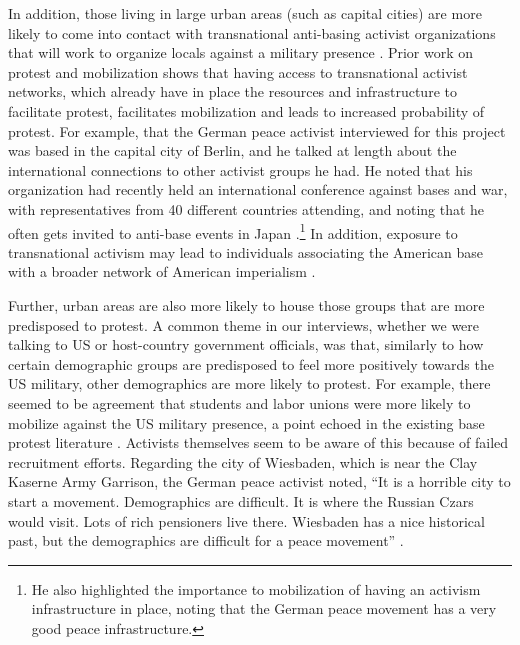 In addition, those living in large urban areas (such as capital cities) are more likely to come into contact with transnational anti-basing activist organizations that will work to organize locals against a military presence \cite{Murdie2011,Murdie2015,Kiyani2020}. Prior work on protest and mobilization shows that having access to transnational activist networks, which already have in place the resources and infrastructure to facilitate protest, facilitates mobilization and leads to increased probability of protest. For example, that the German peace activist interviewed for this project was based in the capital city of Berlin, and he talked at length about the international connections to other activist groups he had. He noted that his organization had recently held an international conference against bases and war, with representatives from 40 different countries attending, and noting that he often gets invited to anti-base events in Japan \cite{berlinone20190723}.\footnote{He also highlighted the importance to mobilization of having an activism infrastructure in place, noting that the German peace movement has a very good peace infrastructure.} In addition, exposure to transnational activism may lead to individuals associating the American base with a broader network of American imperialism \cite{Immerwahr2019}.  

Further, urban areas are also more likely to house those groups that are more predisposed to protest. A common theme in our interviews, whether we were talking to US or host-country government officials, was that, similarly to how certain demographic groups are predisposed to feel more positively towards the US military, other demographics are more likely to protest. For example, there seemed to be agreement that students and labor unions were more likely to mobilize against the US military presence, a point echoed in the existing base protest literature \cite{Fitz2015,embone20180712,berlinone20190723,journ20180712,journ20180713,Allen2020}. Activists themselves seem to be aware of this because of failed recruitment efforts. Regarding the city of Wiesbaden, which is near the Clay Kaserne Army Garrison, the German peace activist noted, ``It is a horrible city to start a movement. Demographics are difficult. It is where the Russian Czars would visit. Lots of rich pensioners live there. Wiesbaden has a nice historical past, but the demographics are difficult for a peace movement'' \cite{berlinone20190723}.


